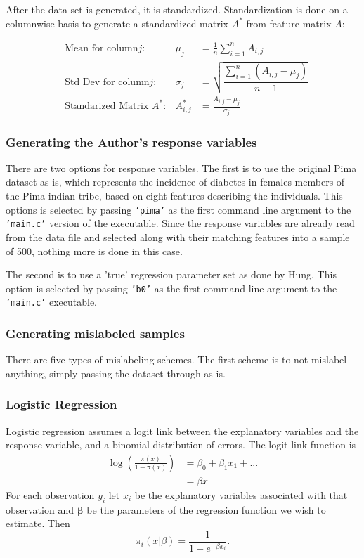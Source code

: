 \documentclass{article}
\begin{document}
After the data set is generated, it is standardized. Standardization is done on a columnwise basis to generate a standardized matrix $A^*$ from feature matrix $A$:

\begin{align*}
&\text{Mean for column} j:& \mu_j &= \frac{1}{n}\sum_{i=1}^{n} A_{i,j}\\
&\text{Std Dev for column} j:& \sigma_j &= \sqrt{\dfrac{\sum_{i=1}^n \left(A_{i,j} - \mu_j\right)}{n-1}}\\
&\text{Standarized Matrix}\,\, A^*:& A^*_{i,j} &= \frac{A_{i,j} - \mu_j}{\sigma_j}
\end{align*}

\subsubsection*{Generating the Author's response variables}

There are two options for response variables. The first is to use the original Pima dataset as is, which represents the incidence of diabetes in females members of the Pima indian tribe, based on eight features describing the individuals. This options is selected by passing \texttt{'pima'} as the first command line argument to the \texttt{'main.c'} version of the executable. Since the response variables are already read from the data file and selected along with their matching features into a sample of 500, nothing more is done in this case. 

The second is to use a 'true' regression parameter set as done by Hung. This option is selected by passing \texttt{'b0'} as the first command line argument to the \texttt{'main.c'} executable. 




\subsubsection*{Generating mislabeled samples}

There are five types of mislabeling schemes. The first scheme is to not mislabel anything, simply passing the dataset through as is. 








\subsubsection*{Logistic Regression}
Logistic regression assumes a logit link between the explanatory variables and the response variable, and a binomial distribution of errors. The logit link function is 
\begin{align*}
\log\left(\frac{\pi(x)}{1-\pi(x)}\right) &= \beta_0 + \beta_1x_1 + ... \\
&= \beta x
\end{align*}
For each observation $y_i$ let $x_i$ be the explanatory variables associated with that observation and $\boldsymbol{\beta}$ be the parameters of the regression function we wish to estimate. Then 
$$\pi_i(x|\beta) = \frac{1}{1+e^{-\beta x_i}}.$$
\end{document}
